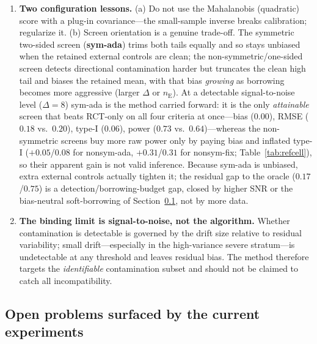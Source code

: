 \documentclass[11pt]{article}
\newcommand{\E}{\mathrm{E}}
\begin{document}
\begin{enumerate}
    \item \textbf{Two configuration lessons.} (a) Do not use the Mahalanobis (quadratic) score with a plug-in covariance---the small-sample inverse breaks calibration; regularize it. (b) Screen orientation is a genuine trade-off. The symmetric two-sided screen (\textbf{sym-ada}) trims both tails equally and so stays unbiased when the retained external controls are clean; the non-symmetric/one-sided screen detects directional contamination harder but truncates the clean high tail and biases the retained mean, with that bias \emph{growing} as borrowing becomes more aggressive (larger $\Delta$ or $n_{\E}$). At a detectable signal-to-noise level ($\Delta{=}8$) sym-ada is the method carried forward: it is the only \emph{attainable} screen that beats RCT-only on all four criteria at once---bias ($0.00$), RMSE ($0.18$ vs.\ $0.20$), type-I ($0.06$), power ($0.73$ vs.\ $0.64$)---whereas the non-symmetric screens buy more raw power only by paying bias and inflated type-I ($+0.05$/$0.08$ for nonsym-ada, $+0.31$/$0.31$ for nonsym-fix; Table~\ref{tab:refcell}), so their apparent gain is not valid inference. Because sym-ada is unbiased, extra external controls actually tighten it; the residual gap to the oracle ($0.17$/$0.75$) is a detection/borrowing-budget gap, closed by higher SNR or the bias-neutral soft-borrowing of Section~\ref{sec:openproblems}, not by more data.
    \item \textbf{The binding limit is signal-to-noise, not the algorithm.} Whether contamination is detectable is governed by the drift size relative to residual variability; small drift---especially in the high-variance severe stratum---is undetectable at any threshold and leaves residual bias. The method therefore targets the \emph{identifiable} contamination subset and should not be claimed to catch all incompatibility.
\end{enumerate}

\subsection{Open problems surfaced by the current experiments}\label{sec:openproblems}
\end{document}
